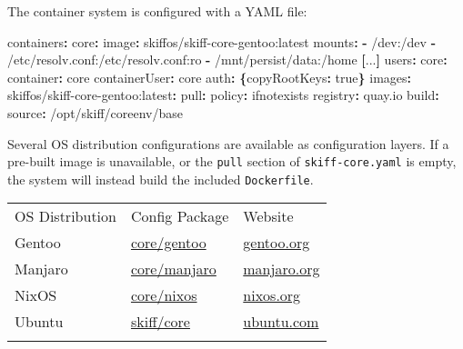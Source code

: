 \documentclass[english,]{IEEEtran}
\newenvironment{Shaded}{}{}
\newcommand{\AttributeTok}[1]{\textcolor[rgb]{0.49,0.56,0.16}{#1}}
\newcommand{\CharTok}[1]{\textcolor[rgb]{0.25,0.44,0.63}{#1}}
\newcommand{\FunctionTok}[1]{\textcolor[rgb]{0.02,0.16,0.49}{#1}}
\newcommand{\KeywordTok}[1]{\textcolor[rgb]{0.00,0.44,0.13}{\textbf{#1}}}
\let\endhead\relax
\begin{document}
The container system is configured with a YAML file:

\begin{Shaded}
\begin{Highlighting}[]
\FunctionTok{containers}\KeywordTok{:}
\AttributeTok{  }\FunctionTok{core}\KeywordTok{:}
\AttributeTok{    }\FunctionTok{image}\KeywordTok{:}\AttributeTok{ skiffos/skiff{-}core{-}gentoo:latest}
\AttributeTok{    }\FunctionTok{mounts}\KeywordTok{:}
\AttributeTok{      }\KeywordTok{{-}}\AttributeTok{ /dev:/dev}
\AttributeTok{      }\KeywordTok{{-}}\AttributeTok{ /etc/resolv.conf:/etc/resolv.conf:ro}
\AttributeTok{      }\KeywordTok{{-}}\AttributeTok{ /mnt/persist/data:/home}
\AttributeTok{    }\KeywordTok{[}\AttributeTok{...}\KeywordTok{]}
\FunctionTok{users}\KeywordTok{:}
\AttributeTok{  }\FunctionTok{core}\KeywordTok{:}
\AttributeTok{    }\FunctionTok{container}\KeywordTok{:}\AttributeTok{ core}
\AttributeTok{    }\FunctionTok{containerUser}\KeywordTok{:}\AttributeTok{ core}
\AttributeTok{    }\FunctionTok{auth}\KeywordTok{:}\AttributeTok{ }\KeywordTok{\{}\FunctionTok{copyRootKeys}\KeywordTok{:}\AttributeTok{ }\CharTok{true}\KeywordTok{\}}
\FunctionTok{images}\KeywordTok{:}
\AttributeTok{  skiffos/skiff{-}core{-}gentoo}\FunctionTok{:latest}\KeywordTok{:}
\AttributeTok{    }\FunctionTok{pull}\KeywordTok{:}
\AttributeTok{      }\FunctionTok{policy}\KeywordTok{:}\AttributeTok{ ifnotexists}
\AttributeTok{      }\FunctionTok{registry}\KeywordTok{:}\AttributeTok{ quay.io}
\AttributeTok{    }\FunctionTok{build}\KeywordTok{:}
\AttributeTok{      }\FunctionTok{source}\KeywordTok{:}\AttributeTok{ /opt/skiff/coreenv/base}
\end{Highlighting}
\end{Shaded}

Several OS distribution configurations are available as configuration
layers. If a pre-built image is unavailable, or the \texttt{pull}
section of \texttt{skiff-core.yaml} is empty, the system will instead
build the included \texttt{Dockerfile}.

\begin{longtable}[]{@{}lll@{}}
\toprule
OS Distribution & Config Package & Website \\ \addlinespace
\midrule
\endhead
Gentoo &
\href{https://github.com/skiffos/skiffos/tree/2020.11.7/configs/core/gentoo}{core/gentoo}
& \href{https://gentoo.org}{gentoo.org} \\ \addlinespace
Manjaro &
\href{https://github.com/skiffos/skiffos/tree/2020.11.7/configs/core/manjaro}{core/manjaro}
& \href{https://manjaro.org}{manjaro.org} \\ \addlinespace
NixOS &
\href{https://github.com/skiffos/skiffos/tree/2020.11.7/configs/core/nixos/}{core/nixos}
& \href{https://nixos.org}{nixos.org} \\ \addlinespace
Ubuntu &
\href{https://github.com/skiffos/skiffos/tree/2020.11.7/configs/skiff/core/}{skiff/core}
& \href{https://ubuntu.com}{ubuntu.com} \\ \addlinespace
\bottomrule
\end{longtable}
\end{document}
